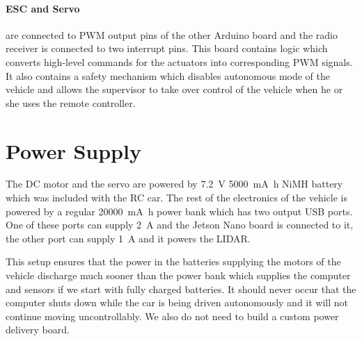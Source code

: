 \paragraph{ESC and Servo} are connected to \gls{PWM} output pins of the other Arduino board and the radio receiver is connected to two interrupt pins. This board contains logic which converts high-level commands for the actuators into corresponding \gls*{PWM} signals. It also contains a safety mechanism which disables autonomous mode of the vehicle and allows the supervisor to take over control of the vehicle when he or she uses the remote controller.

\section{Power Supply}

The \gls*{DC} motor and the servo are powered by \SI{7.2}{\volt} \SI{5000}{\milli\ampere\hour} NiMH battery which was included with the \gls*{RC} car. The rest of the electronics of the vehicle is powered by a regular \SI{20000}{\milli\ampere\hour} power bank which has two output USB ports. One of these ports can supply \SI{2}{\ampere} and the Jetson Nano board is connected to it, the other port can supply \SI{1}{\ampere} and it powers the \gls*{LIDAR}.

This setup ensures that the power in the batteries supplying the motors of the vehicle discharge much sooner than the power bank which supplies the computer and sensors if we start with fully charged batteries. It should never occur that the computer shuts down while the car is being driven autonomously and it will not continue moving uncontrollably. We also do not need to build a custom power delivery board.